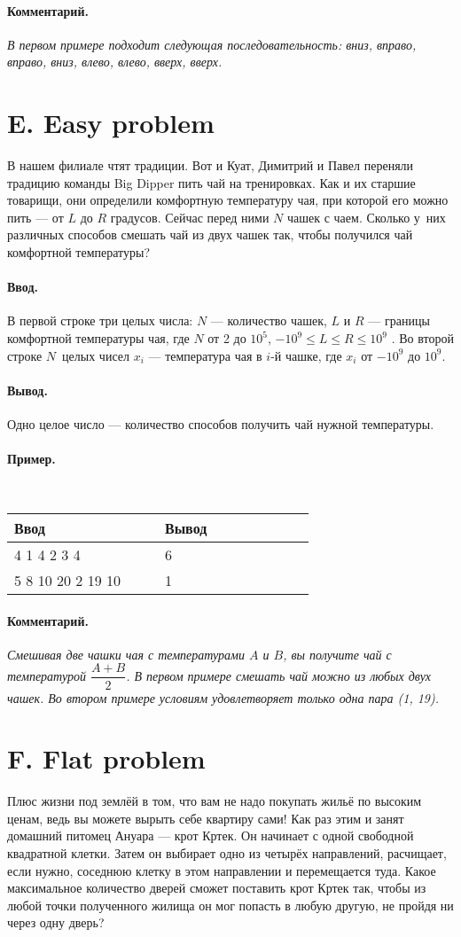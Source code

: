\documentclass[12pt, a5paper]{article}
\newcommand{\informat}[1]
{
	\paragraph{Ввод.\\} #1
}
\newcommand{\outformat}[1]
{
	\paragraph{Вывод.\\} #1
}
\newcommand{\examplee}[4]
{
	\paragraph{Пример.\\}
	{\tt
	\begin{tabular}{|p{0.4\linewidth}|p{0.4\linewidth}|}
	\hline
	Ввод 	& Вывод  	\\
	\hline
	#1 		& #2 		\\
	\hline
	#3		& #4		\\
	\hline
	\end{tabular}
	}
}
\newcommand{\excomm}[1]
{
	\paragraph{Комментарий. \\}
	\textit{#1}
}
\begin{document}
\excomm{В первом примере подходит следующая последовательность: вниз, впра\-во, впра\-во, вниз, влево, влево, вверх, вверх.}





\section*{E. Easy problem}


В нашем филиале чтят традиции. Вот и Куат, Димитрий и Павел переняли традицию команды Big Dipper пить чай на тренировках. Как и их старшие товарищи, они определили комфортную температуру чая, при которой его мож\-но пить --- от $L$ до $R$ градусов. Сейчас перед ними $N$ чашек с чаем. Сколько у~них различных способов смешать чай из двух чашек так, чтобы получился чай комфортной температуры?

\informat{В первой строке три целых числа: $N$ --- количество чашек, $L$ и $R$ --- границы комфортной температуры чая, где $N$ от 2 до $10^5$, $-10^9 \leqslant L \leqslant R \leqslant 10^9$ . \newline
Во второй строке $N$~целых чисел $x_i$ --- температура чая в $i$-й чашке, где $x_i$ от $-10^9$ до $10^9$.}

\outformat{Одно целое число --- количество способов получить чай нужной температуры.}
 
\examplee{
4 1 4 \newline 
1 2 3 4}
{6}
{
5 8 10 \newline
1 20 2 19 10}
{1}

\excomm{Смешивая две чашки чая с температурами $A$ и $B$, вы получите чай с тем\-пе\-ра\-ту\-рой $\dfrac{A+B}{2}$. В первом примере смешать чай можно из любых двух чашек. Во втором примере условиям удовлетворяет только одна пара (1, 19).}
 


\section*{F. Flat problem}

 
Плюс жизни под землёй в том, что вам не надо покупать жильё по высоким ценам, ведь вы можете вырыть себе квартиру сами! Как раз этим и занят домашний питомец Ануара --- крот Кртек. Он начинает с одной свободной квадратной клетки. Затем он выбирает одно из четырёх направлений, рас\-чи\-ща\-ет, если нужно, соседнюю клетку в этом направлении и перемещается туда. Какое максимальное количество дверей сможет поставить крот Кртек так, чтобы из любой точки полученного жилища он мог попасть в любую другую, не пройдя ни через одну дверь? 
 
\end{document}
